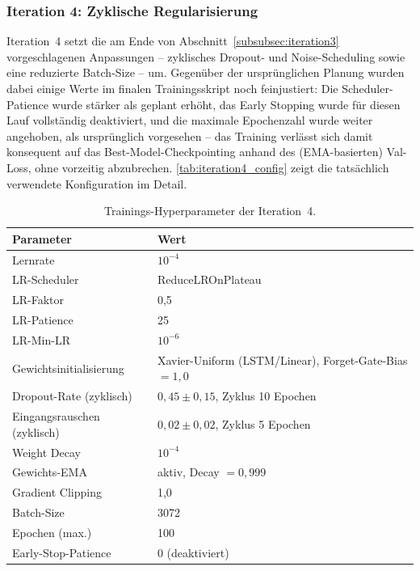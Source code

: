 \subsubsection{Iteration 4: Zyklische Regularisierung}
\label{subsubsec:iteration4}

Iteration~4 setzt die am Ende von Abschnitt~\ref{subsubsec:iteration3} vorgeschlagenen Anpassungen -- zyklisches Dropout- und Noise-Scheduling sowie eine reduzierte Batch-Size -- um. Gegenüber der ursprünglichen Planung wurden dabei einige Werte im finalen Trainingsskript noch feinjustiert: Die Scheduler-Patience wurde stärker als geplant erhöht, das Early Stopping wurde für diesen Lauf vollständig deaktiviert, und die maximale Epochenzahl wurde weiter angehoben, als ursprünglich vorgesehen -- das Training verlässt sich damit konsequent auf das Best-Model-Checkpointing anhand des (EMA-basierten) Val-Loss, ohne vorzeitig abzubrechen. \autoref{tab:iteration4_config} zeigt die tatsächlich verwendete Konfiguration im Detail.

\begin{table}[h]
    \centering
    \caption{Trainings-Hyperparameter der Iteration~4.}
    \label{tab:iteration4_config}
    \begin{tabular}{ll}
        \toprule
        \textbf{Parameter} & \textbf{Wert} \\
        \midrule
        Lernrate                 & $10^{-4}$ \\
        LR-Scheduler             & ReduceLROnPlateau \\
        LR-Faktor                & 0{,}5 \\
        LR-Patience              & 25 \\
        LR-Min-LR                & $10^{-6}$ \\
        Gewichtsinitialisierung  & Xavier-Uniform (LSTM/Linear), Forget-Gate-Bias $= 1{,}0$ \\
        Dropout-Rate (zyklisch)  & $0{,}45 \pm 0{,}15$, Zyklus 10 Epochen \\
        Eingangsrauschen (zyklisch) & $0{,}02 \pm 0{,}02$, Zyklus 5 Epochen \\
        Weight Decay             & $10^{-4}$ \\
        Gewichts-EMA             & aktiv, Decay $= 0{,}999$ \\
        Gradient Clipping        & 1{,}0 \\
        Batch-Size               & 3072 \\
        Epochen (max.)           & 100 \\
        Early-Stop-Patience      & 0 (deaktiviert) \\
        \bottomrule
    \end{tabular}
\end{table}

